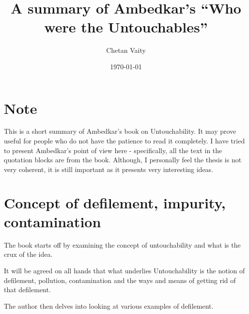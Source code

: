 \documentclass{article}
\begin{document}
\title{A summary of Ambedkar's ``Who were the Untouchables''}
\author{Chetan Vaity}
\date{\today}
\maketitle

\section{Note}
This is a short summary of Ambedkar's book on Untouchability\cite{ambedkar1}. It may prove useful for people who do not have the patience to read it completely. I have tried to present Ambedkar's point of view here - specifically, all the text in the quotation blocks are from the book. Although, I personally feel the thesis is not very coherent, it is still important as it presents very interesting ideas.

\section{Concept of defilement, impurity, contamination}

The book starts off by examining the concept of untouchability and what is the crux of the idea.

\begin{shadequote}
It will be agreed on all hands that what underlies Untouchability is the notion of defilement, pollution, contamination and the ways and means of getting rid of that defilement.
\end{shadequote}

The author then delves into looking at various examples of defilement.
\end{document}
